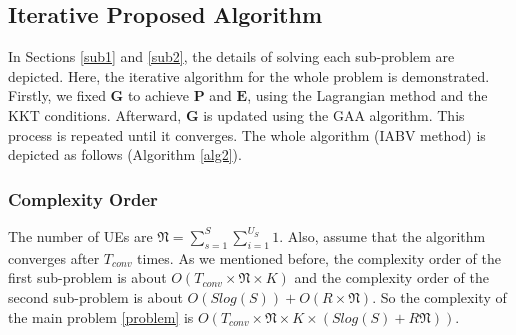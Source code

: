 \documentclass[lettersize,journal]{IEEEtran}
\begin{document}
\subsection{Iterative Proposed Algorithm}
In Sections \eqref{sub1} and \eqref{sub2}, the details of solving each sub-problem are depicted.
Here, the iterative algorithm for the whole problem is demonstrated.
Firstly, we fixed $\boldsymbol{G}$ to achieve $\boldsymbol{P}$ and $\boldsymbol{E}$, using the Lagrangian method and the KKT conditions.
Afterward, $\boldsymbol{G}$ is updated using the GAA algorithm. This process is repeated until it converges.
The whole algorithm (IABV method) is depicted as follows (Algorithm \ref{alg2}).

\subsubsection{Complexity Order}
The number of UEs are $\mathfrak{N} = \sum_{s=1}^{S}\sum_{i=1}^{U_S}1$.
Also, assume that the algorithm converges after $T_{conv}$ times.
As we mentioned before, the complexity order of the first sub-problem is about $O(T_{conv} \times \mathfrak{N} \times K)$
and the complexity order of the second sub-problem is about $O(Slog(S)) + O(R\times \mathfrak{N})$.
So the complexity of the main problem \eqref{problem} is $O(T_{conv} \times \mathfrak{N} \times K \times (Slog(S)+R\mathfrak{N}))$.
\end{document}
